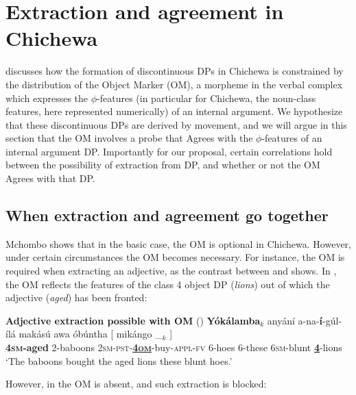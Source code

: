\documentclass[output=paper,colorlinks,citecolor=brown]{langscibook}
\begin{document}
\section{Extraction and agreement in Chichewa}\label{sec:branan:3}

\citet{Mchombo2004, Mchombo2006} discusses how the formation of discontinuous DPs in Chichewa is constrained by the distribution of the Object Marker (OM), a morpheme in the verbal complex which expresses the $\phi$-features (in particular for Chichewa, the noun-class features, here represented numerically) of an internal argument. We hypothesize that these discontinuous DPs are derived by movement, and we will argue in this section that the OM involves a probe that Agrees with the $\phi$-features of an internal argument DP. Importantly for our proposal, certain correlations hold between the possibility of extraction from DP, and whether or not the OM Agrees with that DP.

\subsection{When extraction and agreement go together}\label{sec:branan:3.1}

Mchombo shows that in the basic case, the OM is optional in Chichewa. However, under certain circumstances the OM becomes necessary. For instance, the OM is required when extracting an adjective, as the contrast between  and  shows. In , the OM reflects the features of the class 4 object DP (\textit{lions}) out of which the adjective (\textit{aged}) has been fronted:

\ea%
    \label{ex:branan:5}
    \textbf{Adjective extraction possible with OM} \hfill{(\citealt[ex. 21b]{Mchombo2004})}
    \gll    \textbf{Y\'{o}k\'{a}lamba}$_{k}$ any\'{a}n\'{i} a-na-\textbf{\'{i}}-g\'{u}l-\'{i}l\'{a} mak\'{a}s\'{u} awa \'{o}b\'{u}ntha [ mik\'{a}ngo  \_$_{k}$ ]   \\
             \textbf{4\textsc{sm}-aged} 2-baboons 2\textsc{sm-pst}-\underline{\textbf{4\textsc{om}}}-buy-\textsc{appl-fv} 6-hoes 6-these 6\textsc{sm}-blunt {}  \underline{\textbf{4}}-lions \\
    \glt    `The baboons  bought the aged lions these blunt hoes.'
\z

However, in  the OM is absent, and such extraction is blocked:
\end{document}
